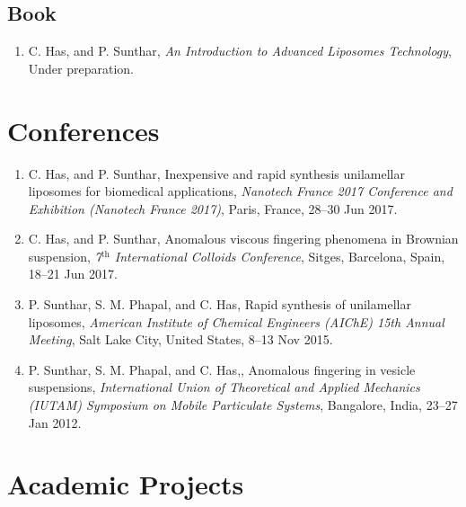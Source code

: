 \documentclass[11pt,a4paper]{moderncv}
\begin{document}
\subsection{\textbf{Book}}

\begin{enumerate}	
	
	\item C. Has, and P.  Sunthar, \textit{An Introduction to Advanced Liposomes Technology}, Under preparation.               
	
\end{enumerate}

\section{Conferences}

\begin{enumerate}	
	
\item C. Has, and P.  Sunthar, Inexpensive and rapid synthesis unilamellar liposomes for biomedical applications, \textit{Nanotech France 2017 Conference and Exhibition (Nanotech France 2017)}, Paris, France, 28--30 Jun 2017.

\item C. Has, and P.  Sunthar, Anomalous viscous fingering phenomena in Brownian suspension, \textit{7$\mathrm{^{th}}$ International Colloids Conference}, Sitges, Barcelona, Spain, 18--21 Jun 2017.

\item  P. Sunthar, S. M. Phapal, and C. Has, Rapid synthesis of unilamellar liposomes, \textit{American Institute of Chemical Engineers (AIChE) 15th Annual Meeting}, Salt Lake City, United States, 8--13 Nov 2015.

\item  P. Sunthar, S. M. Phapal, and C. Has,, Anomalous fingering in vesicle suspensions, \textit{International Union of Theoretical and Applied Mechanics (IUTAM) Symposium on Mobile Particulate Systems}, Bangalore, India, 23--27 Jan 2012.

\end{enumerate}

\section{Academic Projects}
\end{document}
